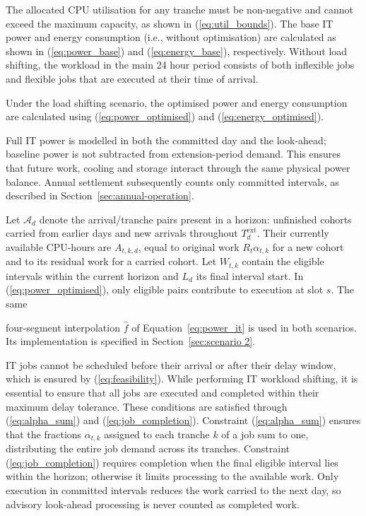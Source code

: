 \documentclass[lettersize,journal]{IEEEtran}
\providecommand{\DIFadd}[1]{{\color{blue}#1}}
\providecommand{\DIFaddbegin}{}
\providecommand{\DIFaddend}{}
\begin{document}
The allocated CPU utilisation for any tranche must be non-negative and cannot exceed the maximum capacity, as shown in (\ref{eq:util_bounds}). The base IT power and energy consumption (i.e., without optimisation) are calculated as shown in (\ref{eq:power_base}) and (\ref{eq:energy_base}), respectively. Without load shifting, the workload in the main 24 hour period consists of both inflexible jobs and flexible jobs that are executed at their time of arrival.

Under the load shifting scenario, the optimised power and energy consumption are calculated using (\ref{eq:power_optimised}) and (\ref{eq:energy_optimised}).  \DIFaddbegin \DIFadd{Full IT power is modelled in both the committed day and the look-ahead; baseline power is not subtracted from extension-period demand. This ensures that future work, cooling and storage interact through the same physical power balance. Annual settlement subsequently counts only committed intervals, as described in Section~\ref{sec:annual-operation}.

}\DIFaddend 

\DIFaddbegin \DIFadd{Let $\mathcal A_d$ denote the arrival/tranche pairs present in a horizon: unfinished cohorts carried from earlier days and new arrivals throughout $T_d^{\mathrm{ext}}$. Their currently available CPU-hours are $A_{t,k,d}$, equal to original work $R_t\alpha_{t,k}$ for a new cohort and to its residual work for a carried cohort. Let $W_{t,k}$ contain the eligible intervals within the current horizon and $L_d$ its final interval start. }\DIFaddend In (\ref{eq:power_optimised}),  \DIFaddbegin \DIFadd{only eligible pairs contribute to execution at slot $s$}\DIFaddend . The same  \DIFaddbegin \DIFadd{four-segment interpolation $\widehat f$ of Equation~\eqref{eq:power_it} is used in both scenarios. Its implementation is specified in Section~\ref{sec:scenario 2}.

}\DIFaddend 

IT jobs cannot be scheduled before their arrival or after their delay window, which is ensured by (\ref{eq:feasibility}). While performing IT workload shifting, it is essential to ensure that all jobs are executed and completed within their maximum delay tolerance. These conditions are satisfied through (\ref{eq:alpha_sum}) and (\ref{eq:job_completion}). Constraint (\ref{eq:alpha_sum}) ensures that the fractions $\alpha_{t,k}$ assigned to each tranche  \DIFaddbegin \DIFadd{$k$ }\DIFaddend of a job sum to one, distributing the entire job demand across its tranches. Constraint (\ref{eq:job_completion})  \DIFaddbegin \DIFadd{requires completion when the final eligible interval lies within the horizon; otherwise it limits processing to the available work. Only execution in committed intervals reduces the work carried to the next day, so advisory look-ahead processing is never counted as completed work}\DIFaddend .
\end{document}
